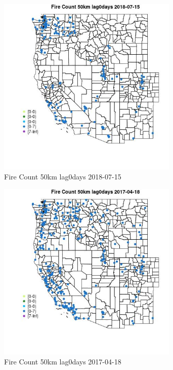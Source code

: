 \begin{figure} 
\centering  
\includegraphics[width=0.77\textwidth]{Code_Outputs/Report_ML_input_PM25_Step4_part_e_de_duplicated_aves_compiled_2019-05-21wNAs_MapObsFire_Count_50km_lag0days2018-07-15.jpg} 
\caption{\label{fig:Report_ML_input_PM25_Step4_part_e_de_duplicated_aves_compiled_2019-05-21wNAsMapObsFire_Count_50km_lag0days2018-07-15}Fire Count 50km lag0days 2018-07-15} 
\end{figure} 
 

\begin{figure} 
\centering  
\includegraphics[width=0.77\textwidth]{Code_Outputs/Report_ML_input_PM25_Step4_part_e_de_duplicated_aves_compiled_2019-05-21wNAs_MapObsFire_Count_50km_lag0days2017-04-18.jpg} 
\caption{\label{fig:Report_ML_input_PM25_Step4_part_e_de_duplicated_aves_compiled_2019-05-21wNAsMapObsFire_Count_50km_lag0days2017-04-18}Fire Count 50km lag0days 2017-04-18} 
\end{figure} 
 

